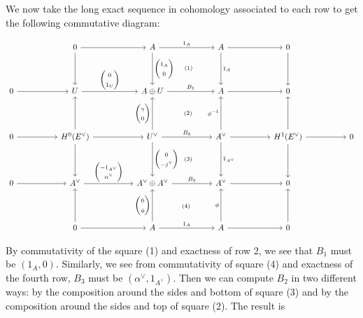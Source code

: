 \message{ !name(Bryan-Vakil.tex)}\documentclass{amsart}
\theoremstyle{definition}
\begin{document}
We now take the long exact sequence in cohomology associated to each
row to get the following commutative diagram:

\begin{equation*}
\begin{tikzcd}[column sep=5em,row sep=4em]
& 0
\arrow[r]
\arrow[d]
& A
\arrow[r,"1_{A}"]
\arrow[d,"\begin{pmatrix}1_{A}\\ 0   \end{pmatrix}"]
& A
\arrow[r]
\arrow[d,"1_{A}"]
& 0
\arrow[d]
& 
\\
0
\arrow[r]
& U
\arrow[r,"\begin{pmatrix}0\\ 1_{U}   \end{pmatrix} "]
& A\oplus U
\arrow[r,"B_{1}"]
\arrow[ur, phantom, "{\scriptstyle(1)}" description]
& A
\arrow[r]
& 0
& 
\\
0\arrow[r]
& H^{0}(E^{\vee})
\arrow[r]
\arrow[u]
\arrow[d]
& U^{\vee }
\arrow[ur, phantom, "{\scriptstyle(2)}" description]
\arrow[r,"B_{2}"]
\arrow[u,"\begin{pmatrix}\gamma \\ 0   \end{pmatrix}"]
\arrow[d,"\begin{pmatrix}0 \\ -j^{\vee }   \end{pmatrix}"]
& A^{\vee}
\arrow[r]
\arrow[u,"\phi^{-1}"]
\arrow[d,"1_{A^{\vee}}"]
& H^{1}(E^{\vee})
\arrow[r]
\arrow[u]
\arrow[d]
& 0
\\
0
\arrow[r]
& A^{\vee }
\arrow[r," \begin{pmatrix} -1_{A^{\vee}}\\ \alpha^{\vee }  \end{pmatrix}"]
& A^{\vee }\oplus A^{\vee }
\arrow[ur, phantom, "{\scriptstyle(3)}" description]
\arrow[r,"B_{3}"]
& A^{\vee }
\arrow[r]
& 0
&
\\
& 0
\arrow[r]
\arrow[u]
& A
\arrow[ur, phantom, "{\scriptstyle(4)}" description]
\arrow[r,"1_{A}"]
\arrow[u," \begin{pmatrix} 0\\ \phi   \end{pmatrix}"]
& A
\arrow[r]
\arrow[u,"\phi "]
& 0
\arrow[u]
&
\end{tikzcd}
\end{equation*}

By commutativity of the square (1) and exactness of row 2, we see that
$B_{1}$ must be $(1_{A},0)$. Similarly, we see from commutativity of
square (4) and exactness of the fourth row, $B_{3}$ must be
$(\alpha^{\vee},1_{A^{\vee}})$. Then we can compute $B_{2}$ in two
different ways: by the composition around the sides and bottom of
square (3) and by the composition around the sides and top of square
(2). The result is
\end{document}
